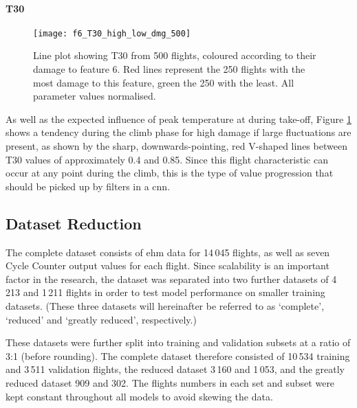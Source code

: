 \paragraph{T30}
\begin{figure}
    \centering
    \texttt{[image: f6\_T30\_high\_low\_dmg\_500]}
    \caption{\label{fig:high_low_dmg_T30} Line plot showing T30 from 500 flights, coloured according to their damage to feature 6. Red lines represent the 250 flights with the most damage to this feature, green the 250 with the least. All parameter values normalised.}
\end{figure}

As well as the expected influence of peak temperature at during take-off, Figure \ref{fig:high_low_dmg_T30} shows a tendency during the climb phase for high damage if large fluctuations are present, as shown by the sharp, downwards-pointing, red V-shaped lines between T30 values of approximately 0.4 and 0.85. Since this flight characteristic can occur at any point during the climb, this is the type of value progression that should be picked up by filters in a \ac{cnn}.

\subsection{Dataset Reduction} \label{sec:data_sizes}
The complete dataset consists of \ac{ehm} data for 14\,045 flights, as well as seven Cycle Counter output values for each flight. Since scalability is an important factor in the research, the dataset was separated into two further datasets of 4\,213 and 1\,211 flights in order to test model performance on smaller training datasets. (These three datasets will hereinafter be referred to as `complete', `reduced' and `greatly reduced', respectively.)

These datasets were further split into training and validation subsets at a ratio of 3:1 (before rounding). The complete dataset therefore consisted of 10\,534 training and 3\,511 validation flights, the reduced dataset 3\,160 and 1\,053, and the greatly reduced dataset 909 and 302. The flights numbers in each set and subset were kept constant throughout all models to avoid skewing the data.



